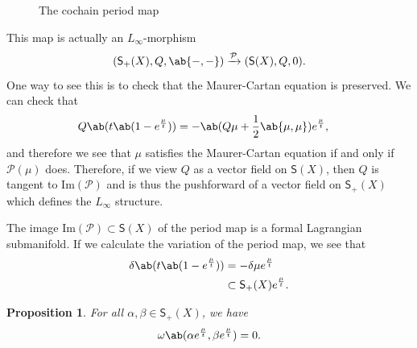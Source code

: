 \documentclass[article,10pt,oneside,oldfontcommands]{memoir}
\newtheorem{prop}[thm]{Proposition}
\theoremstyle{definition}
\theoremstyle{remark}
\theoremstyle{plain}
\theoremstyle{definition}
\theoremstyle{remark}
\newcommand{\Ima}{\mathrm{Im}}
\newcommand{\mc}[1]{\mathcal{#1}}
\newcommand{\ms}[1]{\mathsf{#1}}
\newcommand{\1}{\mathbf{1}}
\newcommand{\2}{\mathbf{2}}
\newcommand{\3}{\mathbf{3}}
\begin{document}
\begin{figure}[htpb]
\begin{center}
\end{center}
\caption{The cochain period map}%
\label{fig:cochain-period-map}
\end{figure}

This map is actually an \(L_{\infty}\)-morphism
\[ (\ms{S}_+(X), Q, \ab\{-,-\}) \xrightarrow{\mc{P}}  (\ms{S}(X), Q, 0). \]
One way to see this is to check that the Maurer-Cartan equation is preserved. We can check that 
\begin{align*}
    Q \ab(t \ab(1-e^{\frac{\mu}{t}})) &= -\ab(Q \mu + \frac{1}{2} \ab\{\mu, \mu\}) e^{\frac{\mu}{t}},
\end{align*}
and therefore we see that \(\mu\) satisfies the Maurer-Cartan equation if and only if \(\mc{P}(\mu)\) does. Therefore, if we view \(Q\) as a vector field on \(\ms{S}(X)\), then \(Q\) is tangent to \(\Ima(\mc{P})\) and is thus the pushforward of a vector field on \(\ms{S}_+(X)\) which defines the \(L_{\infty}\) structure.

The image \(\Ima(\mc{P}) \subset \ms{S}(X)\) of the period map is a formal Lagrangian submanifold. If we calculate the variation of the period map, we see that
\begin{align*}
    \delta \ab(t \ab(1-e^{\frac{\mu}{t}})) &= - \delta \mu e^{\frac{\mu}{t}} \\
    &\subset \ms{S}_+(X) e^{\frac{\mu}{t}}.
\end{align*}

\begin{prop}
    For all \(\alpha, \beta \in \ms{S}_+(X)\), we have
    \[ \omega \ab(\alpha e^{\frac{\mu}{t}}, \beta e^{\frac{\mu}{t}}) = 0. \]
\end{prop}
\end{document}
